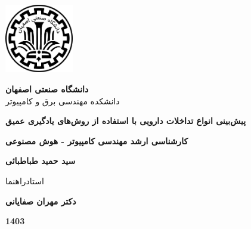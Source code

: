 \thispagestyle{empty}
\begin{center}
\includegraphics[height=3cm]{iut_logo.png}
\vspace{0.4cm}

{\large
	\textbf{دانشگاه صنعتی اصفهان}\\
	دانشکده مهندسی برق و کامپیوتر
}
\vspace{3.5cm}

{\LARGE
	\textbf{پیش‌بینی انواع تداخلات دارویی با استفاده از روش‌های یادگیری عمیق}\\
}
\vspace{3.5cm}

{\large
	\textbf{کارشناسی ارشد مهندسی کامپیوتر - هوش مصنوعی}\\
}
\vspace{1cm}

{\Large
	\textbf{سید حمید طباطبائی}\\
}
\vspace{2.5cm}

{\large
	استادراهنما\\
}
\vspace{0.5cm}

{\Large
	\textbf{دکتر مهران صفایانی}\\
}
\vspace{3.5cm}

{\Large
	\textbf{1403}
}

\end{center}
\restoregeometry
\pagebreak

